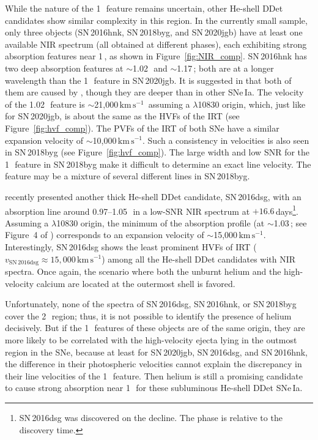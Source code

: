 \documentclass[twocolumn]{aastex631}
\newcommand{\sn}{SN\,2020jgb}
\newcommand{\kms}{$\mathrm{km}\,\mathrm{s}^{-1}$}
\begin{document}
While the nature of the 1\,\micron\ feature remains uncertain, other He-shell DDet candidates show similar complexity in this region. In the currently small sample, only three objects (SN\,2016hnk, SN\,2018byg, and \sn) have at least one available NIR spectrum (all obtained at different phases), each exhibiting strong absorption features near 1\,\micron, as shown in Figure~\ref{fig:NIR_comp}. SN\,2016hnk has two deep absorption features at $\sim$1.02\,\micron\ and $\sim$1.17\,\micron; both are at a longer wavelength than the 1\,\micron\ feature in \sn. It is suggested in \citet{galbany_16hnk_2019} that both of them are caused by , though they are deeper than in other SNe\,Ia. The velocity of the 1.02\,\micron\ feature is $\sim$21,000\,\kms\ assuming a  $\lambda$10830 origin, which, just like for \sn, is about the same as the HVFs of the  IRT (see Figure~\ref{fig:hvf_comp}). The PVFs of the  IRT of both SNe have a similar expansion velocity of $\sim$10,000\,\kms. Such a consistency in velocities is also seen in SN\,2018byg (see Figure~\ref{fig:hvf_comp}). The large width and low SNR for the 1\,\micron\ feature in SN\,2018byg make it difficult to determine an exact line velocity. The feature may be a mixture of several different lines in SN\,2018byg.

\citet{Dong_16dsg_2022} recently presented another thick He-shell DDet candidate, SN\,2016dsg, with an absorption line around 0.97--1.05\,\micron\ in a low-SNR NIR spectrum at $+16.6$\,days\footnote{SN\,2016dsg was discovered on the decline. The phase is relative to the discovery time.}. Assuming a  $\lambda$10830 origin, the minimum of the absorption profile (at $\sim$1.03\,\micron; see Figure~4 of \citealp{Dong_16dsg_2022}) corresponds to an expansion velocity of $\sim$15,000\,\kms. Interestingly, SN\,2016dsg shows the least prominent HVFs of  IRT ($v_\mathrm{SN\,2016dsg} \approx 15,000$\,\kms) among all the He-shell DDet candidates with NIR spectra. Once again, the scenario where both the unburnt helium and the high-velocity calcium are located at the outermost shell is favored.

Unfortunately, none of the spectra of SN\,2016dsg, SN\,2016hnk, or SN\,2018byg cover the 2\,\micron\ region; thus, it is not possible to identify the presence of helium decisively. But if the 1\,\micron\ features of these objects are of the same origin, they are more likely to be correlated with the high-velocity ejecta lying in the outmost region in the SNe, because at least for \sn, SN\,2016dsg, and SN\,2016hnk, the difference in their photospheric velocities cannot explain the discrepancy in their line velocities of the 1\,\micron\ feature. Then helium is still a promising candidate to cause strong absorption near 1\,\micron\ for these subluminous He-shell DDet SNe\,Ia.
\end{document}
